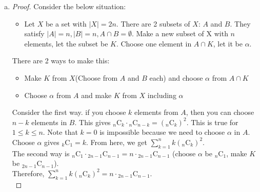 \begin{enumerate} [(a)]
\begin{proof}
			Therefore, $_{n}\mathrm{C}_{r}\cdot{_{r}\mathrm{C}_{k}} = {_{n}\mathrm{C}_{k}}\cdot{_{n - k}\mathrm{C}_{r - k}}$.\\
		\end{proof}
		\item \begin{proof}
			Consider the below situation:
			\begin{itemize}
				\item [] Let $X$ be a set with $|X| = 2n$. There are 2 subsets of $X$: $A$ and $B$. They satisfy $|A| = n, |B| = n, A\cap B = \emptyset$. Make a new subset of X with $n$ elements, let the subset be $K$. Choose one element in $A\cap K$, let it be $\alpha$.
			\end{itemize}
			\begin{center}
			\end{center}
			There are 2 ways to make this:
			\begin{itemize}
				\item Make $K$ from $X$(Choose from $A$ and $B$ each) and choose $\alpha$ from $A\cap K$
				\item Choose $\alpha$ from $A$ and make $K$ from $X$ including $\alpha$ 
			\end{itemize}
			Consider the first way. if you choose $k$ elements from $A$, then you can choose $n - k$ elements in $B$. This gives ${_{n}\mathrm{C}_{k}}\cdot{_{n}\mathrm{C}_{n - k}} = \left({_{n}\mathrm{C}_{k}}\right)^2$. This is true for $1 \leq k \leq n$. Note that $k = 0$ is impossible because we need to choose $\alpha$ in $A$. Choose $\alpha$ gives $_{k}\mathrm{C}_{1} = k$. From here, we get $\sum\limits_{k=1}^n k\left({_{n}\mathrm{C}_{k}}\right)^2$.\\
			The second way is $_{n}\mathrm{C}_{1}\cdot{_{2n - 1}\mathrm{C}_{n - 1}} = n\cdot{_{2n - 1}\mathrm{C}_{n - 1}}$ (choose $\alpha$ be $_{n}\mathrm{C}_{1}$, make $K$ be $_{2n - 1}\mathrm{C}_{n - 1}$).\\
			Therefore, $\sum\limits_{k=1}^n k\left(_{n}\mathrm{C}_{k}\right)^2 = n\cdot{_{2n - 1}\mathrm{C}_{n - 1}}$.\\
		\end{proof}
	\end{enumerate}